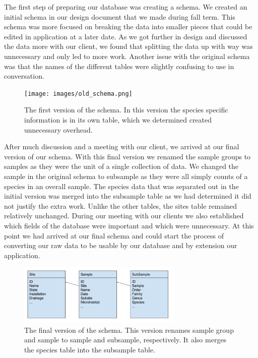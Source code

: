 \documentclass[10pt,draftclsnofoot,onecolumn]{IEEEtran}
\begin{document}
The first step of preparing our database was creating a schema.
We created an initial schema in our design document that we made during fall term.
This schema was more focused on breaking the data into smaller pieces that could be edited in application at a later date.
As we got further in design and discussed the data more with our client, we found that splitting the data up with way was unnecessary and only led to more work.
Another issue with the original schema was that the names of the different tables were slightly confusing to use in conversation.

\begin{figure}[h]
	\centering
	\texttt{[image: images/old\_schema.png]}
	\captionsetup{justification=centering}
	\caption{
		The first version of the schema.
		In this version the species specific information is in its own table, which we determined created unnecessary overhead.
	}
	\label{fig:old_schema}
\end{figure}

After much discussion and a meeting with our client, we arrived at our final version of our schema.
With this final version we renamed the sample groups to samples as they were the unit of a single collection of data.
We changed the sample in the original schema to subsample as they were all simply counts of a species in an overall sample.
The species data that was separated out in the initial version was merged into the subsample table as we had determined it did not justify the extra work.
Unlike the other tables, the sites table remained relatively unchanged.
During our meeting with our clients we also established which fields of the database were important and which were unnecessary.
At this point we had arrived at our final schema and could start the process of converting our raw data to be usable by our database and by extension our application.

\begin{figure}[h]
	\centering
	\includegraphics[width=0.70\textwidth]{images/new_schema.png}
	\captionsetup{justification=centering}
	\caption{
		The final version of the schema.
		This version renames sample group and sample to sample and subsample, respectively.
		It also merges the species table into the subsample table.
	}
	\label{fig:new_schema}
\end{figure}
\end{document}
